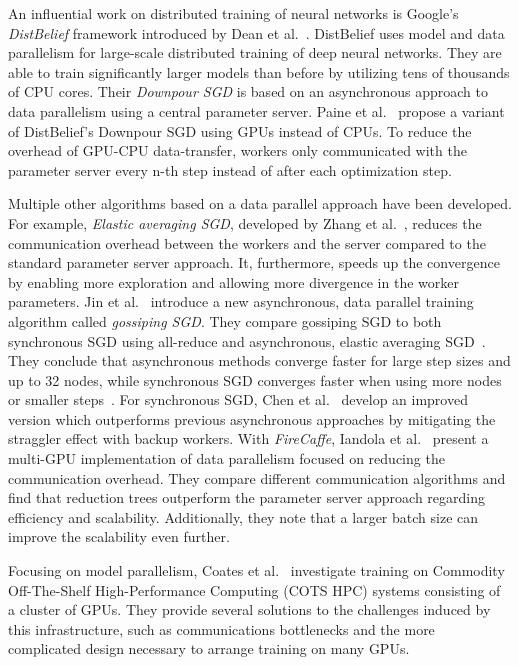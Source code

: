 \documentclass[conference]{IEEEtran}
\begin{document}
An influential work on distributed training of neural networks is Google’s \emph{DistBelief} framework introduced by Dean et al.~\cite{dean2012-Large-scale-distributed}.
DistBelief uses model and data parallelism for large-scale distributed training of deep neural networks.
They are able to train significantly larger models than before by utilizing tens of thousands of CPU cores.
Their \emph{Downpour SGD} is based on an asynchronous approach to data parallelism using a central parameter server.
%
Paine et al.~\cite{paine2013-GPU-async-SGD} propose a variant of DistBelief's Downpour SGD using GPUs instead of CPUs.
To reduce the overhead of GPU-CPU data-transfer, workers only communicated with the parameter server every n-th step instead of after each optimization step.

Multiple other algorithms based on a data parallel approach have been developed.
%
For example, \emph{Elastic averaging SGD}, developed by Zhang et al.~\cite{zhang2015-Elastic-AvgSGD}, reduces the communication overhead between the workers and the server compared to the standard parameter server approach.
It, furthermore, speeds up the convergence by enabling more exploration and allowing more divergence in the worker parameters.
%
Jin et al.~\cite{jin2016-How-to-scale} introduce a new asynchronous, data parallel training algorithm called \emph{gossiping SGD}.
They compare gossiping SGD to both synchronous SGD using all-reduce and asynchronous, elastic averaging SGD~\cite{zhang2015-Elastic-AvgSGD}.
They conclude that asynchronous methods converge faster for large step sizes and up to 32 nodes, while synchronous SGD converges faster when using more nodes or smaller steps~\cite{jin2016-How-to-scale}.
%
For synchronous SGD, Chen et al.~\cite{chen2016-Revisiting-distributed-synchronous-SGD} develop an improved version which outperforms previous asynchronous approaches by mitigating the straggler effect with backup workers.
%
With \emph{FireCaffe}, Iandola et al.~\cite{iandola2016-Firecaffe} present a multi-GPU implementation of data parallelism focused on reducing the communication overhead.
They compare different communication algorithms and find that reduction trees outperform the parameter server approach regarding efficiency and scalability.
Additionally, they note that a larger batch size can improve the scalability even further.

Focusing on model parallelism, Coates et al.~\cite{coates2013-DL-COTS-HPC} investigate training on Commodity Off-The-Shelf High-Performance Computing (COTS HPC) systems consisting of a cluster of GPUs.
They provide several solutions to the challenges induced by this infrastructure, such as communications bottlenecks and the more complicated design necessary to arrange training on many GPUs.
\end{document}
